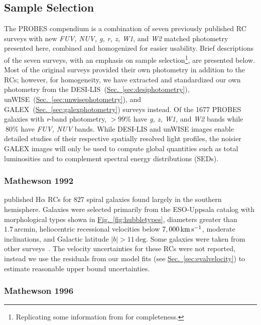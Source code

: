 \documentclass[twocolumn]{aastex631}
\newcommand{\Sec}[1]{{\protect\hyperref[sec:#1]{Sec.~\ref*{sec:#1}}}}
\newcommand{\Fig}[1]{{\protect\hyperref[fig:#1]{Fig.~\ref*{fig:#1}}}}
\newcommand{\Ha}{H\ensuremath{\alpha}\xspace}
\newcommand{\wunits}[2]{\ensuremath{#1\,\text{#2}}}
\newcommand{\probesphotometric}{1677\xspace}
\begin{document}
\subsection{Sample Selection}\label{sec:sampleselection}

The PROBES compendium is a combination of seven previously published RC surveys with new {\it FUV, NUV, g, r, z, W1}, and {\it W2} matched photometry presented here, combined and homogenized for easier usability.
Brief descriptions of the seven surveys, with an emphasis on sample selection\footnote{Replicating some information from \citet{Stone2019} for completeness.}, are presented below.
Most of the original surveys provided their own photometry in addition to the RCs; however, for homogeneity, we have extracted and standardized our own photometry from the DESI-LIS~(\Sec{desiphotometry}), unWISE~(\Sec{unwisephotometry}), and GALEX~(\Sec{galexphotometry}) surveys instead.
Of the \probesphotometric PROBES galaxies with {\it r}-band photometry, $>99\%$ have {\it g, z, W1, } and {\it W2} bands while $~80\%$ have {\it FUV, NUV} bands.
While DESI-LIS and unWISE images enable detailed studies of their respective spatially resolved light profiles, the noisier GALEX images will only be used to compute global quantities such as total luminosities and to complement spectral energy distributions (SEDs).  

\subsubsection{Mathewson 1992}

\citet{Mathewson1992} published \Ha RCs for 827 spiral galaxies found largely in the southern hemisphere. 
Galaxies were selected primarily from the ESO-Uppsala catalog \citep{Lauberts1982,Lauberts1998} with morphological types shown in \Fig{hubbletypes}, diameters greater than \wunits{1.7}{arcmin}, 
heliocentric recessional velocities below \wunits{7,000}{km\,s$^{-1}$}, moderate inclinations, and Galactic latitude $|b| > \wunits{11}{deg}$. 
Some galaxies were taken from other surveys~\citep{Mathewson1992}.
The velocity uncertainties for these RCs were not reported, instead we use the residuals from our model fits (see \Sec{evalvelocity}) to estimate reasonable upper bound uncertainties.

\subsubsection{Mathewson 1996}
\end{document}
